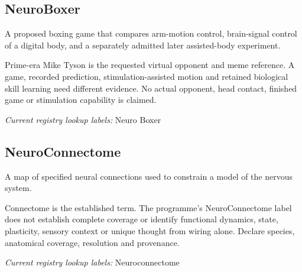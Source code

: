 \begin{samepage}
\subsection*{NeuroBoxer}
\noindent A proposed boxing game that compares arm-motion control, brain-signal control of a digital body, and a separately admitted later assisted-body experiment.\par
\end{samepage}
\noindent Prime-era Mike Tyson is the requested virtual opponent and meme reference. A game, recorded prediction, stimulation-assisted motion and retained biological skill learning need different evidence. No actual opponent, head contact, finished game or stimulation capability is claimed.\par





\noindent\textit{Current registry lookup labels:} Neuro Boxer\par

\begin{samepage}
\subsection*{NeuroConnectome}
\noindent A map of specified neural connections used to constrain a model of the nervous system.\par
\end{samepage}
\begin{samepage}
\noindent Connectome is the established term. The programme's NeuroConnectome label does not establish complete coverage or identify functional dynamics, state, plasticity, sensory context or unique thought from wiring alone. Declare species, anatomical coverage, resolution and provenance.\par\nopagebreak[4]

\end{samepage}


\noindent\textit{Current registry lookup labels:} Neuroconnectome\par

